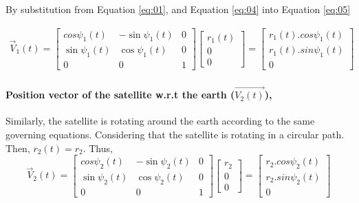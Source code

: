 \documentclass[11pt]{article}
\begin{document}
By substitution from Equation \ref{eq:01}, and Equation \ref{eq:04} into Equation \ref{eq:05}

\begin{gather}\label{eq:06}
\vec{V}_1(t) = \begin{bmatrix}
            cos{\psi_1(t)}  &  -\sin{\psi_1(t)}  &  0    \\
            \sin{\psi_1(t)}&   \cos{\psi_1(t)}    & 0\\
            0          &    0   & 1          
            \end{bmatrix}  \begin{bmatrix}
            r_1(t)   \\
            0 \\
             0             
            \end{bmatrix}  
            = \begin{bmatrix}
            r_1(t) . cos{\psi_1(t)}  \\
            r_1(t) . sin{\psi_1(t)} \\
             0             
            \end{bmatrix}
\end{gather}

\paragraph{Position vector of the satellite w.r.t the earth ($\vec{V_2(t)}$),}


Similarly, the satellite is rotating around the earth according to the same governing equations. Considering that the satellite is rotating in a circular path. Then, $r_2(t) = r_2$. Thus,
\begin{equation}
    \vec{V}_2(t) = \begin{bmatrix}
            cos{\psi_2(t)}  &  -\sin{\psi_2(t)}  &  0    \\
            \sin{\psi_2(t)}&   \cos{\psi_2(t)}    & 0\\
            0          &    0   & 1          
            \end{bmatrix}  \begin{bmatrix}
            r_2   \\
            0 \\
             0             
            \end{bmatrix}  
            = \begin{bmatrix}
            r_2 . cos{\psi_2(t)}  \\
            r_2 . sin{\psi_2(t)} \\
             0             
            \end{bmatrix}
\end{equation}
\end{document}
